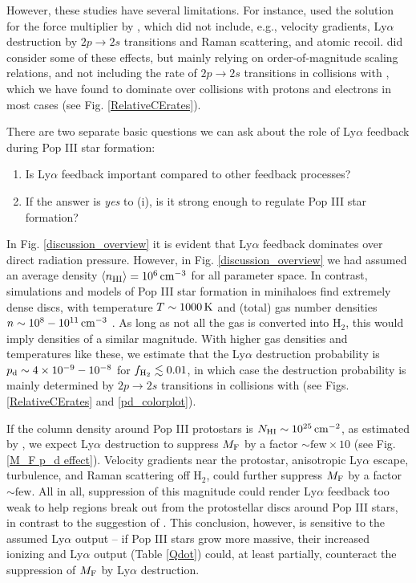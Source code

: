 \documentclass[fleqn,usenatbib]{mnras}
\newcommand\HI{\ion{H}{I}\xspace} %
\newcommand\HII{\ion{H}{II}\xspace} %
\begin{document}
However, these studies have several limitations. For instance, \cite{Nebrin2022} used the solution for the force multiplier by \cite{Tomaselli2021}, which did not include, e.g., velocity gradients, Ly$\alpha$ destruction by $2p \rightarrow 2s$ transitions and Raman scattering, and atomic recoil. \cite{McKee2008} did consider some of these effects, but mainly relying on order-of-magnitude scaling relations, and not including the rate of $2p \rightarrow 2s$ transitions in collisions with \HI, which we have found to dominate over collisions with protons and electrons in most cases (see Fig. \ref{RelativeCErates}). 

There are two separate basic questions we can ask about the role of Ly$\alpha$ feedback during Pop III star formation:
\begin{enumerate}
    \item Is Ly$\alpha$ feedback important compared to other feedback processes?
    \item If the answer is \textit{yes} to (i), is it strong enough to regulate Pop III star formation?
\end{enumerate}
In Fig. \ref{discussion_overview} it is evident that Ly$\alpha$ feedback dominates over direct radiation pressure. However, in Fig. \ref{discussion_overview} we had assumed an average \HI density $\langle n_{\rm HI} \rangle = 10^6 \, \rm cm^{-3}$ for all parameter space. In contrast, simulations and models of Pop III star formation in minihaloes find extremely dense discs, with temperature $T \sim 1000 \, \rm K$ and (total) gas number densities $n \sim 10^8 - 10^{11} \, \rm cm^{-3}$ \citep[e.g.][]{Jaura2022, Sugimura2023_PopIII}. As long as not all the gas is converted into H$_2$, this would imply \HI densities of a similar magnitude. With higher gas densities and temperatures like these, we estimate that the Ly$\alpha$ destruction probability is $p_{\rm d} \sim 4 \times 10^{-9} - 10^{-8}$ for $f_{\rm H_2} \lesssim 0.01$, in which case the destruction probability is mainly determined by $2p \rightarrow 2s$ transitions in collisions with \HI (see Figs. \ref{RelativeCErates} and \ref{pd_colorplot}).

If the \HI column density around Pop III protostars is $N_{\rm HI} \sim 10^{25} \, \rm cm^{-2}$, as estimated by \cite{Jaura2022}, we expect Ly$\alpha$ destruction to suppress $M_{\rm F}$ by a factor $\sim \textrm{few} \times 10$ (see Fig. \ref{M_F p_d effect}). Velocity gradients near the protostar, anisotropic Ly$\alpha$ escape, turbulence, and Raman scattering off H$_2$, could further suppress $M_{\rm F}$ by a factor $\sim \textrm{few}$. All in all, suppression of this magnitude could render Ly$\alpha$ feedback too weak to help \HII regions break out from the protostellar discs around Pop III stars, in contrast to the suggestion of \cite{Jaura2022}. This conclusion, however, is sensitive to the assumed Ly$\alpha$ output -- if Pop III stars grow more massive, their increased ionizing and Ly$\alpha$ output (Table \ref{Qdot}) could, at least partially, counteract the suppression of $M_{\rm F}$ by Ly$\alpha$ destruction. 
\end{document}
